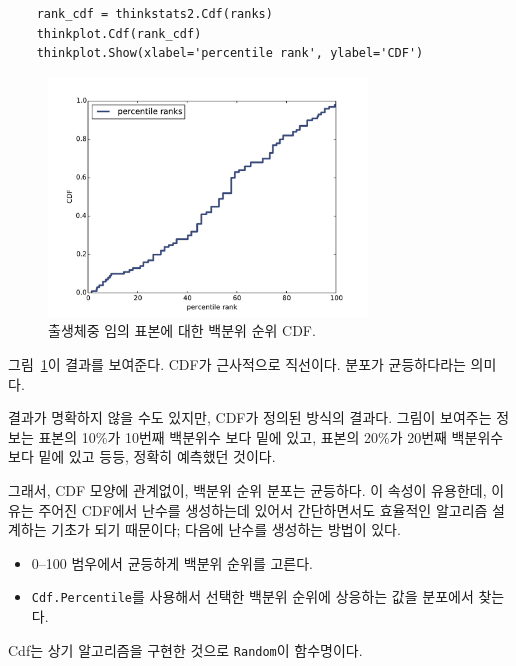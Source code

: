 \begin{verbatim}
    rank_cdf = thinkstats2.Cdf(ranks)
    thinkplot.Cdf(rank_cdf)
    thinkplot.Show(xlabel='percentile rank', ylabel='CDF')
\end{verbatim}

\begin{figure}
\centerline{\includegraphics[height=2.5in]{figs/cumulative_random.pdf}}
\caption{출생체중 임의 표본에 대한 백분위 순위 CDF.}
\label{cumulative_random}
\end{figure}

그림~\ref{cumulative_random}이 결과를 보여준다.
CDF가 근사적으로 직선이다. 분포가 균등하다라는 의미다. 

결과가 명확하지 않을 수도 있지만, CDF가 정의된 방식의 결과다.
그림이 보여주는 정보는 표본의 10\%가 10번째 백분위수 보다 밑에 있고,
표본의 20\%가 20번째 백분위수 보다 밑에 있고 등등, 정확히 예측했던 것이다.

그래서, CDF 모양에 관계없이, 백분위 순위 분포는 균등하다. 
이 속성이 유용한데, 이유는 주어진 CDF에서 난수를 생성하는데 있어서 간단하면서도 효율적인 알고리즘 설계하는 기초가 되기 때문이다; 다음에 난수를 생성하는 방법이 있다.


\begin{itemize}

\item 0--100 범우에서 균등하게 백분위 순위를 고른다.

\item {\tt Cdf.Percentile}를 사용해서 선택한 백분위 순위에 상응하는 값을 분포에서 찾는다.

\end{itemize}

Cdf는 상기 알고리즘을 구현한 것으로 {\tt Random}이 함수명이다.

